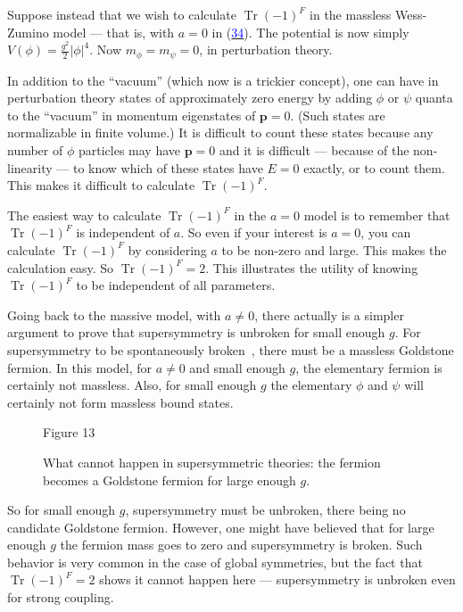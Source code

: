 \documentclass[11pt,a4paper]{article}
\newcommand{\eqnref}[1]{(\hyperlink{eq:#1}{\textcolor{blue}{#1}})}
\begin{document}
Suppose instead that we wish to calculate $\operatorname{Tr}(-1)^F$ in the massless
Wess-Zumino model --- that is, with $a = 0$ in \eqnref{34}. The potential
is now simply $V(\phi) = \frac{g^2}{2} |\phi|^4$. Now $m_\phi = m_\psi = 0$, in perturbation theory.

In addition to the ``vacuum'' (which now is a trickier concept), one
can have in perturbation theory states of approximately zero energy
by adding $\phi$ or $\psi$ quanta to the ``vacuum'' in momentum eigenstates of
$\mathbf p = 0$. (Such states are normalizable in finite volume.) It is difficult
to count these states because any number of $\phi$ particles may
have $\mathbf p = 0$ and it is difficult --- because of the non-linearity ---
to know which of these states have $E = 0$ exactly, or to count them.
This makes it difficult to calculate $\operatorname{Tr}(-1)^F$.

The easiest way to calculate $\operatorname{Tr}(-1)^F$ in the $a = 0$ model is to
remember that $\operatorname{Tr}(-1)^F$ is independent of $a$. So even if your interest
is $a = 0$, you can calculate $\operatorname{Tr}(-1)^F$ by considering $a$ to be non-zero
and large. This makes the calculation easy. So $\operatorname{Tr}(-1)^F = 2$. This
illustrates the utility of knowing $\operatorname{Tr}(-1)^F$ to be independent of all
parameters.

Going back to the massive model, with $a \neq 0$, there actually is
a simpler argument to prove that supersymmetry is unbroken for small
enough $g$. For supersymmetry to be spontaneously broken~\cite{ref2}, there
must be a massless Goldstone fermion. In this model, for $a \neq 0$ and
small enough $g$, the elementary fermion is certainly not massless.
Also, for small enough $g$ the elementary $\phi$ and $\psi$ will certainly not
form massless bound states.

\begin{figure}
\vspace{-0.4\baselineskip}
\centering

\par\smallskip
Figure 13

What cannot happen in supersymmetric theories: the fermion
becomes a Goldstone fermion for large enough $g$.
\vspace{-0.5\baselineskip}
\end{figure}

So for small enough $g$, supersymmetry must be unbroken, there
being no candidate Goldstone fermion. However, one might have
believed that for large enough $g$
the fermion mass goes to zero and
supersymmetry is broken. Such
behavior is very common in the
case of global symmetries, but
the fact that $\operatorname{Tr}(-1)^F = 2$ shows
it cannot happen here --- supersymmetry is unbroken even for
strong coupling.
\end{document}
